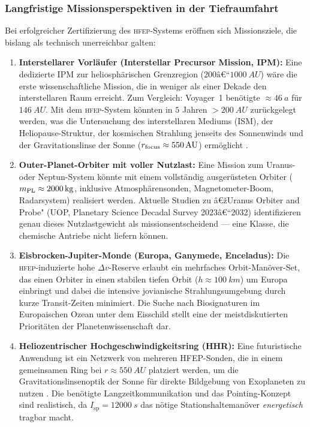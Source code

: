 ﻿\documentclass[a4paper,12pt,twoside]{article}
\theoremstyle{plain}
\theoremstyle{definition}
\theoremstyle{remark}
\newcommand{\Isp}{I_{\mathrm{sp}}}
\newcommand{\Dv}{\Delta v}
\newcommand{\HFEP}{\textsc{hfep}}
\begin{document}
	\subsubsection{Langfristige Missionsperspektiven in der Tiefraumfahrt}

	Bei erfolgreicher Zertifizierung des \HFEP-Systems eröffnen sich Missionsziele,
	die bislang als technisch unerreichbar galten:

	\begin{enumerate}
		\item \textbf{Interstellarer Vorläufer (Interstellar Precursor Mission, IPM):}
		Eine dedizierte IPM zur heliosphärischen Grenzregion
		($200\text{â€“}\SI{1000}{AU}$) wäre die erste wissenschaftliche Mission, die
		in weniger als einer Dekade den interstellaren Raum erreicht. Zum Vergleich:
		Voyager~1 benötigte $\approx\SI{46}{a}$ für $\SI{146}{AU}$. Mit dem
		\HFEP-System könnten in $5$ Jahren $>\SI{200}{AU}$ zurückgelegt werden,
		was die Untersuchung des interstellaren Mediums (ISM), der
		Heliopause-Struktur, der kosmischen Strahlung jenseits des Sonnenwinds und
		der Gravitationslinse der Sonne ($r_{\rm focus} \approx \SI{550}{AU}$)
		ermöglicht \cite{stone2013}.

		\item \textbf{Outer-Planet-Orbiter mit voller Nutzlast:}
		Eine Mission zum Uranus- oder Neptun-System könnte mit einem vollständig
		ausgerüsteten Orbiter ($m_{\rm PL} \approx \SI{2000}{kg}$, inklusive
		Atmosphärensonden, Magnetometer-Boom, Radarsystem) realisiert werden.
		Aktuelle Studien zu â€žUranus Orbiter and Probe" (UOP, Planetary Science
		Decadal Survey 2023â€“2032) identifizieren genau dieses Nutzlastgewicht als
		missionsentscheidend --- eine Klasse, die chemische Antriebe nicht liefern
		können.

		\item \textbf{Eisbrocken-Jupiter-Monde (Europa, Ganymede, Enceladus):}
		Die \HFEP-induzierte hohe $\Dv$-Reserve erlaubt ein mehrfaches
		Orbit-Manöver-Set, das einen Orbiter in einen stabilen tiefen Orbit
		($h \approx \SI{100}{km}$) um Europa einbringt und dabei die intensive
		jovianische Strahlungsumgebung durch kurze Transit-Zeiten minimiert. Die
		Suche nach Biosignaturen im Europaischen Ozean unter dem Eisschild stellt
		eine der meistdiskutierten Prioritäten der Planetenwissenschaft dar.

		\item \textbf{Heliozentrischer Hochgeschwindigkeitsring (HHR):}
		Eine futuristische Anwendung ist ein Netzwerk von mehreren HFEP-Sonden,
		die in einem gemeinsamen Ring bei $r \approx \SI{550}{AU}$ platziert werden,
		um die Gravitationslinsenoptik der Sonne für direkte Bildgebung
		von Exoplaneten zu nutzen \cite{kohlhase1977}. Die benötigte
		Langzeitkommunikation und das Pointing-Konzept sind realistisch, da
		$\Isp = \SI{12000}{s}$ das nötige Stationshaltemanöver \emph{energetisch}
		tragbar macht.


\end{enumerate}
\end{document}

